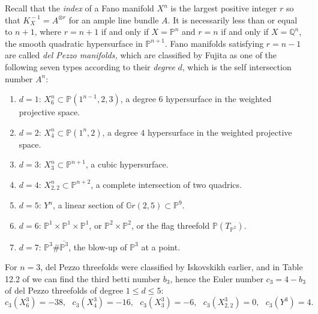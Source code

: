 \documentclass{amsart}
\numberwithin{equation}{section}
\theoremstyle{definition}
\renewcommand{\1}{\mathds{1}}
\renewcommand{\>}{\rightarrow}
\begin{document}
Recall that the {\em index} of a Fano manifold $X^n$ is the largest positive integer $r$ so that $K^{\!-\!1}_{\!X} = A^{\otimes r}$ for an ample line bundle $A$. It is necessarily less than or equal to $n+1$, where $r=n+1$ if and only if $X={\mathbb P}^n$ and $r=n$ if and only if $X={\mathbb Q}^n$, the smooth quadratic hypersurface in ${\mathbb P}^{n+1}$. Fano manifolds satisfying $r=n-1$ are called {\em del Pezzo manifolds,} which are classified by Fujita \cite{Fujita} as one of the following seven types according to their {\em degree} $d$, which is the self intersection number $A^n$:
\begin{enumerate}
\item $d=1$: $X^n_6\subset {\mathbb P}(1^{n-1}, 2, 3)$, a degree $6$ hypersurface in the weighted projective space.
\item $d=2$: $X^n_4\subset {\mathbb P}(1^{n}, 2)$, a degree $4$ hypersurface in the weighted projective space.
\item $d=3$: $X^n_3\subset {\mathbb P}^{n+1}$, a cubic hypersurface.
\item $d=4$: $X^n_{2,2}\subset {\mathbb P}^{n+2}$, a complete intersection of two quadrics.
\item $d=5$: $Y^n$, a linear section of ${\mathbb Gr}(2,5) \subset {\mathbb P}^9$.
\item $d=6$: ${\mathbb P}^1\!\times \! {\mathbb P}^1\!\times \!{\mathbb P}^1$, or ${\mathbb P}^2\!\times \! {\mathbb P}^2$, or the flag threefold ${\mathbb P}(T_{ \!{\mathbb P}^{2}} )$.
\item $d=7$: ${\mathbb P}^3\# \overline{{\mathbb P}^3} $, the blow-up of ${\mathbb P}^3$ at a point.
\end{enumerate}

For $n=3$, del Pezzo threefolds were classified by Iskovskikh \cite{Iskov} earlier, and in Table 12.2 of \cite{IP} we can find the third betti number $b_3$, hence the Euler number $c_3=4-b_3$ of del Pezzo threefolds of degree $1\leq d\leq 5$:
\begin{equation} \label{eq:7.9}
c_3(X^3_6)=-38, \ \ \ c_3(X^3_4)=-16, \ \ \ c_3(X^3_3) = -6, \ \ \ c_3(X^3_{2,2})= 0, \ \ \ c_3(Y^3)= 4.
\end{equation}
\end{document}
